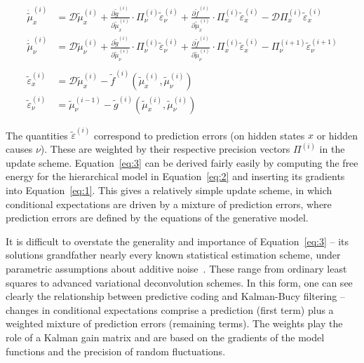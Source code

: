 \documentclass[a4paper]{article} %
\begin{document}
\begin{align}
\dot{\tilde{\mu}}^{(i)}_x &= \mathcal{D} \tilde{\mu}^{(i)}_x + \frac{\partial \tilde{g}^{(i)}}{\partial \tilde{\mu}^{(i)}_x} \cdot \Pi^{(i)}_\nu \tilde{\varepsilon}^{(i)}_\nu + \frac{\partial \tilde{f}^{(i)}}{\partial \tilde{\mu}^{(i)}_x} \cdot \Pi^{(i)}_x \tilde{\varepsilon}^{(i)}_x -  \mathcal{D}  \Pi^{(i)}_x \tilde{\varepsilon}^{(i)}_x \nonumber \\%
\dot{\tilde{\mu}}^{(i)}_\nu &= \mathcal{D} \tilde{\mu}^{(i)}_\nu + \frac{\partial \tilde{g}^{(i)}}{\partial \tilde{\mu}^{(i)}_\nu} \cdot \Pi^{(i)}_\nu \tilde{\varepsilon}^{(i)}_\nu + \frac{\partial \tilde{f}^{(i)}}{\partial \tilde{\mu}^{(i)}_\nu} \cdot \Pi^{(i)}_x \tilde{\varepsilon}^{(i)}_x - \Pi^{(i+1)}_\nu \tilde{\varepsilon}^{(i+1)}_\nu \nonumber \\%
 \label{eq:3} \\%
\tilde{\varepsilon}^{(i)}_x &= \mathcal{D} \tilde{\mu}^{(i)}_x - \tilde{f}^{(i)}(\tilde{\mu}^{(i)}_x, \tilde{\mu}^{(i)}_\nu) \nonumber \\%
\tilde{\varepsilon}^{(i)}_\nu &= \tilde{\mu}^{(i-1)}_\nu - \tilde{g}^{(i)}(\tilde{\mu}^{(i)}_x, \tilde{\mu}^{(i)}_\nu)  \nonumber  %
\end{align}%

The quantities $\tilde{\varepsilon}^{(i)}$ correspond to prediction errors (on hidden states $x$ or hidden causes $\nu$). These are weighted by their respective precision vectors $\Pi^{(i)}$ in the update scheme. %
Equation~\ref{eq:3} can be derived fairly easily by computing the free energy
for the hierarchical model in Equation~\ref{eq:2} and inserting its gradients
into Equation~\ref{eq:1}. This gives a relatively simple update scheme, in
which conditional expectations are driven by a mixture of prediction
errors, where prediction errors are defined by the equations of the
generative model.

It is difficult to overstate the generality and importance of Equation~\ref{eq:3} -- its solutions grandfather nearly every known statistical
estimation scheme, under parametric assumptions about additive noise~\citep{Friston08b}. These range from ordinary least squares to advanced
variational deconvolution schemes. In this form, one can see clearly the
relationship between predictive coding and Kalman-Bucy filtering --
changes in conditional expectations comprise a prediction (first term)
plus a weighted mixture of prediction errors (remaining terms). The
weights play the role of a Kalman gain matrix and are based on the
gradients of the model functions and the precision of random
fluctuations.
\end{document}
